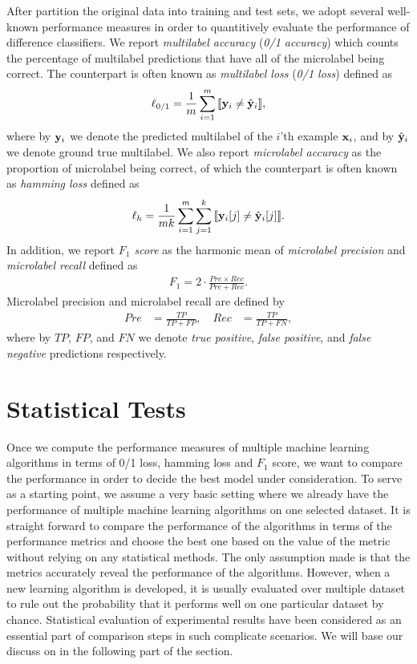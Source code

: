 {After partition the original data into training and test sets, we adopt several well-known performance measures in order to quantitively evaluate the performance of difference classifiers.
We report \textit{multilabel accuracy} (\textit{0/1 accuracy}) which counts the percentage of multilabel predictions that have all of the microlabel being correct.
The counterpart is often known as \textit{multilabel loss} (\textit{0/1 loss}) defined as
\begin{align*}
	\ell_{0/1} = \frac{1}{m}\sum_{i=1}^{m}{\llbracket \mathbf {y}_i \neq \hat{\mathbf {y}}_i \rrbracket},
\end{align*}
where by $\mathbf {y}_i$ we denote the predicted multilabel of the $i$'th example $\mathbf {x}_i$, and by $\hat{\mathbf {y}}_i$ we denote ground true multilabel.
We also report \textit{microlabel accuracy} as the proportion of microlabel being correct, of which the counterpart is often known as \textit{hamming loss} defined as
\begin{align*}
	\ell_{h} = \frac{1}{mk}\sum_{i=1}^{m}\sum_{j=1}^{k}{\llbracket \mathbf {y}_i[j] \neq \hat{\mathbf {y}}_i[j] \rrbracket}.
\end{align*}
In addition, we report \textit{$F_1$ score} as the harmonic mean of \textit{microlabel precision} and \textit{microlabel recall} defined as
\begin{align*}
	F_1 = 2\cdot\frac{Pre\times Rec}{Pre+Rec}.
\end{align*}
Microlabel precision and microlabel recall are defined by
\begin{align*}
	Pre &= \frac{TP}{TP+FP}, \quad Rec &= \frac{TP}{TP+FN},
\end{align*}
where by $TP$, $FP$, and $FN$ we denote \textit{true positive}, \textit{false positive}, and \textit{false negative} predictions respectively.


%
\section{Statistical Tests} \label{sc_st}

Once we compute the performance measures of multiple machine learning algorithms in terms of 0/1 loss, hamming loss and $F_1$ score, we want to compare the performance in order to decide the best model under consideration. 
To serve as a starting point, we assume a very basic setting where we already have the performance of multiple machine learning algorithms on one selected dataset.
It is straight forward to compare the performance of the algorithms in terms of the performance metrics and choose the best one based on the value of the metric without relying on any statistical methods.
The only assumption made is that the metrics accurately reveal the performance of the algorithms.
However, when a new learning algorithm is developed, it is usually evaluated over multiple dataset to rule out the probability that it performs well on one particular dataset by chance.
Statistical evaluation of experimental results have been considered as an essential part of comparison steps in such complicate scenarios.
We will base our discuss on \citep{Demsar06statistical,Garcia08an} in the following part of the section.

}
